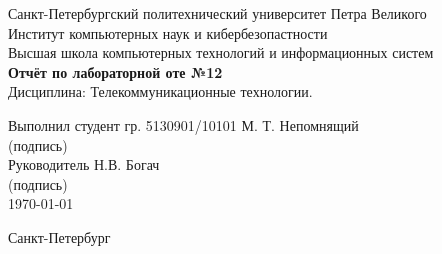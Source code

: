 \begin{titlepage}	%

	\begin{center}		%

		\large Санкт-Петербургский политехнический университет Петра Великого\\[.4cm]
		\large Институт компьютерных наук и кибербезопастности \\[.4cm]
		\large Высшая школа компьютерных технологий и информационных систем\\[5cm]
		
		\Large \textbf{Отчёт по лабораторной оте №12}\\[0.3cm]
		\large Дисциплина: Телекоммуникационные технологии.\\[4cm]

	\end{center}

	\large Выполнил студент гр. 5130901/10101\hfill \underline{\hphantom{(12подпись12)}} \hfill М. Т. Непомнящий\\[.1cm]
	\large \hphantom{Выполнил студент гр. 5130901/10101}\hfill (подпись) \hfill \hphantom{М. Т. Непомнящий}\\[1.5cm]

	\large Руководитель \hphantom{дент гр. 513090}\hfill \underline{\hphantom{(12подпись12)}} \hfill Н.В. Богач\\[.1cm]
	\large \hphantom{Выполнил студент гр. 5130901/10101}\hfill (подпись) \hfill \hphantom{М. Т. Непомнящий}\\[2cm]

	\hfill\large \today

	\vfill %

	\begin{center}
	\large Санкт-Петербург\\
	\large \the\year %
	\end{center} %

\end{titlepage} %

\vfill %

